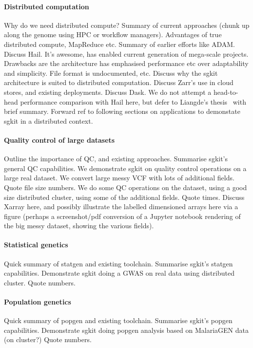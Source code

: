 \documentclass[a4paper,num-refs]{oup-contemporary}
\begin{document}
\paragraph{Distributed computation}
Why do we need distributed compute? Summary of current
approaches (chunk up along the genome using HPC or workflow
managers). Advantages of true distributed compute, MapReduce
etc. Summary of earlier efforts like ADAM.
Discuss Hail. It's awesome, has enabled current
generation of mega-scale projects. Drawbacks are the
architecture has emphasised performance etc over adaptability
and simplicity. File format is undocumented, etc.
Discuss why the sgkit architecture is suited to distributed
computation. Discuss Zarr's use in cloud stores, and existing
deployments. Discuss Dask.
We do not attempt a head-to-head performance comparison with
Hail here, but defer to Liangde's thesis~\citep{li2022efficient}
with brief summary.
Forward ref to following sections on applications to demonstate
sgkit in a distributed context.

\paragraph{Quality control of large datasets}
Outline the importance of QC, and existing approaches.
Summarise sgkit's general QC capabilities.
We demonstrate sgkit on quality control operations on a large
real dataset. We convert large messy VCF with lots of additional
fields. Quote file size numbers. We do some QC operations on
the dataset, using a good size distributed cluster, using
some of the additional fields. Quote times. Discuss Xarray
here, and possibly illustrate the labelled dimensioned arrays
here via a figure (perhaps a screenshot/pdf conversion of
a Jupyter notebook rendering of the big messy dataset,
showing the various fields).

\paragraph{Statistical genetics}
Quick summary of statgen and existing toolchain.
Summarise sgkit's statgen capabilities.
Demonstrate sgkit doing a GWAS on real data using distributed cluster.
Quote numbers.

\paragraph{Population genetics}
Quick summary of popgen and existing toolchain.
Summarise sgkit's popgen capabilities.
Demonstrate
sgkit doing popgen analysis based on MalariaGEN data (on cluster?)
Quote numbers.
\end{document}

